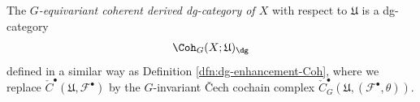 \begin{dfn}\label{dfn:GEquivQCohdg}
The
\emph{$G$-equivariant coherent derived dg-category of $X$}
with respect to
$\mathfrak{U}$
is a dg-category
$$
\Coh_G(X;\mathfrak{U})_{\dg}
$$
defined in a similar way as Definition \ref{dfn:dg-enhancement-Coh}, where we replace $\check{C}^{\bullet} (\mathfrak{U},\mathcal{F}^{\bullet})$ by the $G$-invariant \v{C}ech cochain complex $\check{C}^{\bullet}_G (\mathfrak{U},(\mathcal{F}^{\bullet},\theta))$.



\end{dfn}
